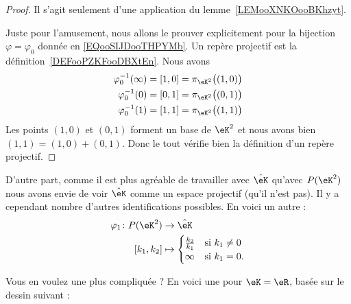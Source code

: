 \begin{proof}
	Il s'agit seulement d'une application du lemme~\ref{LEMooXNKOooBKhzyt}.

	Juste pour l'amusement, nous allons le prouver explicitement pour la bijection \( \varphi=\varphi_0\) donnée en \eqref{EQooSIJDooTHPYMb}. Un repère projectif est la définition~\ref{DEFooPZKFooDBXtEn}. Nous avons
	\begin{subequations}
		\begin{align}
			\varphi_0^{-1}(\infty)=[1,0]=\pi_{\eK^2}\big( (1,0) \big) \\
			\varphi_0^{-1}(0)=[0,1]=\pi_{\eK^2}\big( (0,1) \big)      \\
			\varphi_0^{-1}(1)=[1,1]=\pi_{\eK^2}\big( (1,1) \big)
		\end{align}
	\end{subequations}
	Les points \( (1,0)\) et \( (0,1)\) forment un base de \( \eK^2\) et nous avons bien \( (1,1)=(1,0)+(0,1)\). Donc le tout vérifie bien la définition d'un repère projectif.
\end{proof}

D'autre part, comme il est plus agréable de travailler avec \( \hat\eK\) qu'avec \( P(\eK^2)\) nous avons envie de voir \( \hat\eK\) comme un espace projectif (qu'il n'est pas). Il y a cependant nombre d'autres identifications possibles. En voici un autre :
\begin{equation}
	\begin{aligned}
		\varphi_1\colon P(\eK^2) & \to \hat\eK                                         \\
		[k_1,k_2]                & \mapsto \begin{cases}
			                                   \frac{ k_2 }{ k_1 } & \text{si  } k_1\neq 0 \\
			                                   \infty              & \text{si } k_1=0.
		                                   \end{cases}
	\end{aligned}
\end{equation}

Vous en voulez une plus compliquée ? En voici une pour \( \eK=\eR\), basée sur le dessin suivant :
\begin{center}
	
\end{center}

